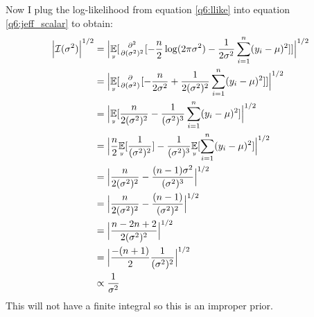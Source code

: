 Now I plug the log-likelihood from equation \ref{q6:llike}  into equation \ref{q6:jeff_scalar} to obtain:
\begin{align*}
    \Big| \fishinf{\sigma^2} \Big|^{1/2} &= \Big|\expec[y]{\secpartiald{}{(\sigma^2)}[-\frac{n}{2}\log(2\pi\sigma^2) - \frac{1}{2\sigma^2}\sum_{i=1}^n(y_i-\mu)^2]}\Big|^{1/2}\\
                                         &= \Big|\expec[y]{\partiald{}{(\sigma^2)}[-\frac{n}{2\sigma^2}+ \frac{1}{2(\sigma^2)^2}\sum_{i=1}^n(y_i-\mu)^2]}\Big|^{1/2}\\
                                         &= \Big|\expec[y]{\frac{n}{2(\sigma^2)^2}- \frac{1}{(\sigma^2)^3}\sum_{i=1}^n(y_i-\mu)^2}\Big|^{1/2}\\
                                         &= \Big|\frac{n}{2}\expec[y]{\frac{1}{(\sigma^2)^2}}- \frac{1}{(\sigma^2)^3}\expec[y]{\sum_{i=1}^n(y_i-\mu)^2}\Big|^{1/2}\\
                                         &= \Big|\frac{n}{2(\sigma^2)^2} - \frac{(n-1)\sigma^2}{(\sigma^2)^3}\Big|^{1/2}\\
                                         &= \Big|\frac{n}{2(\sigma^2)^2} - \frac{(n-1)}{(\sigma^2)^2}\Big|^{1/2}\\
                                         &= \Big|\frac{n-2n+2}{2(\sigma^2)^2} \Big|^{1/2}\\
                                         &= \Big|\frac{-(n+1)}{2}\frac{1}{(\sigma^2)^2} \Big|^{1/2}\\
                                         &\propto \frac{1}{\sigma^2}
\end{align*}
This will not have a finite integral so this is an improper prior.

